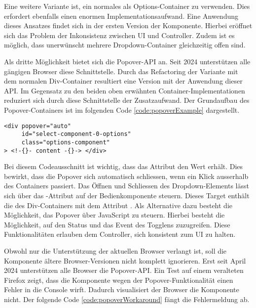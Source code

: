 Eine weitere Variante ist, ein normales  als Options-Container zu verwenden. 
Dies erfordert ebenfalls einen enormen Implementationsaufwand. 
Eine Anwendung dieses Ansatzes findet sich in der ersten Version der Komponente. 
Hierbei eröffnet sich das Problem der Inkonsistenz zwischen UI und Controller. 
Zudem ist es möglich, dass unerwünscht mehrere Dropdown-Container gleichzeitig offen sind. 

Als dritte Möglichkeit bietet sich die Popover-API an. 
Seit 2024 unterstützen alle gängigen Browser diese Schnittstelle. 
Durch das Refactoring der Variante mit dem normalen Div-Container resultiert eine Version mit der Anwendung dieser API. 
Im Gegensatz zu den beiden oben erwähnten Container-Implementationen reduziert sich durch diese Schnittstelle der Zusatzaufwand. 
Der Grundaufbau des Popover-Containers ist im folgenden Code \ref{code:popoverExample} dargestellt. 

\begin{lstlisting}[style = htmlcssjs, caption = Popover-Container Beispiel, label = code:popoverExample]
<div popover="auto"
     id="select-component-0-options" 
     class="options-component" 
> <!-{}- content -{}-> </div>
\end{lstlisting}

Bei diesem Codeausschnitt ist wichtig, dass das Attribut  den Wert  erhält. 
Dies bewirkt, dass die Popover sich automatisch schliessen, wenn ein Klick ausserhalb des Containers passiert. 
Das Öffnen und Schliessen des Dropdown-Elements lässt sich über das -Attribut auf der Bedienkomponente steuern. 
Dieses Target enthält die  des Div-Containers mit dem Attribut . 
Als Alternative dazu besteht die Möglichkeit, das Popover über JavaScript zu steuern. 
Hierbei besteht die Möglichkeit, auf den Status und das Event des Togglens zuzugreifen. 
Diese Funktionalitäten erlauben dem Controller, sich konsistent zum UI zu halten. 

Obwohl nur die Unterstützung der aktuellen Browser verlangt ist, soll die Komponente ältere Browser-Versionen nicht komplett ignorieren. 
Erst seit April 2024 unterstützen alle Browser die Popover-API. 
Ein Test auf einem veralteten Firefox zeigt, dass die Komponente wegen der Popover-Funktionalität einen Fehler in die Console wirft.
Dadurch visualisiert der Browser die Komponente nicht. 
Der folgende Code \ref{code:popoverWorkaround} fängt die Fehlermeldung ab. 

